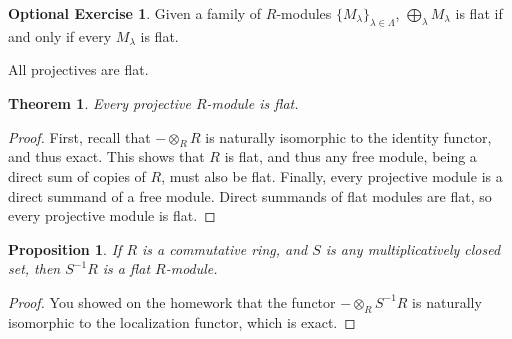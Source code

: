 \documentclass{amsart}[12pt]
\numberwithin{equation}{section}
\theoremstyle{plain} %
\newtheorem{thm}[equation]{Theorem}
\newtheorem{prop}[equation]{Proposition}
\theoremstyle{definition}
\newtheorem{exer}[equation]{Optional Exercise}
\theoremstyle{remark}
\begin{document}
\begin{exer}\label{direct sum of flats}
	Given a family of $R$-modules $\{ M_\lambda \}_{\lambda \in \Lambda}$, $\bigoplus_\lambda M_\lambda$ is flat if and only if every $M_\lambda$ is flat.
\end{exer}



All projectives are flat.

\begin{thm}\label{projectives are flat}
	Every projective $R$-module is flat.
\end{thm}

\begin{proof}
	First, recall that $- \otimes_R R$ is naturally isomorphic to the identity functor, and thus exact. This shows that $R$ is flat, and thus any free module, being a direct sum of copies of $R$, must also be flat. Finally, every projective module is a direct summand of a free module. Direct summands of flat modules are flat, so every projective module is flat.
\end{proof}

\begin{prop} If $R$ is a commutative ring, and $S$ is any multiplicatively closed set, then $S^{-1}R$ is a flat $R$-module.
\end{prop}
\begin{proof}
You showed on the homework that the functor $- \otimes_R S^{-1}R$ is naturally isomorphic to the localization functor, which is exact.
\end{proof}
\end{document}
